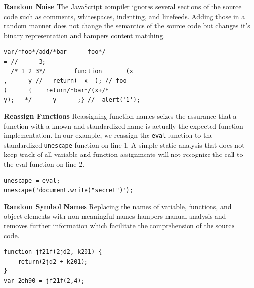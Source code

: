 			\def\leftside{0.475\textwidth}
			\def\rightside{0.475\textwidth}
			\begin{itemize}
					\begin{minipage}{\leftside}
						\item \textbf{Random Noise} The JavaScript compiler ignores several sections of the source code such as comments, whitespaces, indenting, and linefeeds. Adding those in a random manner does not change the semantics of the source code but changes it's binary representation and hampers content matching.
					\end{minipage} \hspace{1em}
					\begin{minipage}{\rightside}	
							\begin{lstlisting}
var/*foo*/add/*bar      foo*/
= //      3;
  /* 1 2 3*/        function       (x
,      y //   return(  x  ); // foo
)      {    return/*bar*/(x+/*
y);   */      y      ;} //  alert('1');\end{lstlisting}
					\end{minipage} 
			
					\begin{minipage}{\leftside}
						\item \textbf{Reassign Functions} Reassigning function names seizes the assurance that a function with a known and standardized name is actually the expected function implementation. In our example, we reassign the \texttt{eval} function to the standardized \texttt{unescape} function on line 1. A simple static analysis that does not keep track of all variable and function assignments will not recognize the call to the eval function on line 2.
					\end{minipage} \hspace{1em}
					\begin{minipage}{\rightside}	
						\begin{lstlisting}
unescape = eval;
unescape('document.write("secret")');\end{lstlisting}
					\end{minipage} 
					
					\begin{minipage}{\leftside}
						\item \textbf{Random Symbol Names} Replacing the names of variable, functions, and object elements with non-meaningful names hampers manual analysis and removes further information which facilitate the comprehension of the source code.
					\end{minipage} \hspace{1em}
					\begin{minipage}{\rightside}	
						\begin{lstlisting}
function jf21f(2jd2, k201) {
	return(2jd2 + k201);
}
var 2eh90 = jf21f(2,4);\end{lstlisting}
					\end{minipage} 	
					

\end{itemize}
